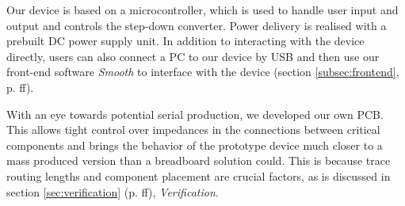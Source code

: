Our device is based  on a microcontroller, which is used  to handle user input
and output and  controls the step-down converter.  Power  delivery is realised
with a  prebuilt DC  power supply  unit. In addition  to interacting  with the
device directly, users can also connect a PC to our device by USB and then use
our front-end  software \emph{Smooth}  to interface  with the  device (section
\ref{subsec:frontend}, p. \pageref{subsec:frontend}ff).

With  an  eye  towards  potential  serial production,  we  developed  our  own
PCB. This  allows tight  control over  impedances in  the connections  between
critical  components  and   brings  the  behavior  of   the  prototype  device
much  closer   to  a  mass   produced  version  than  a   breadboard  solution
could. This  is because  trace  routing lengths  and  component placement  are
crucial  factors,  as  is  discussed  in  section  \ref{sec:verification}  (p.
\pageref{sec:verification}ff), \emph{Verification}.
